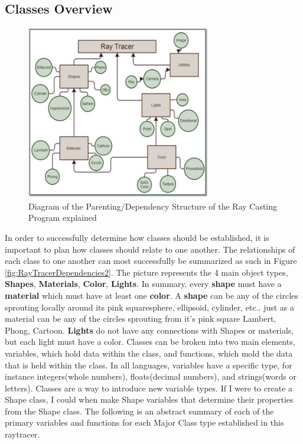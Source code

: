 \subsection{Classes Overview}
\begin{figure}[ht]
\centering
\includegraphics[height=3.0in]{figures/rayTracerStructure.jpg}
\caption{Diagram of the Parenting/Dependency Structure of the Ray Casting Program explained}
\label{fig:RayTracerDependencies}
\end{figure}
In order to successfully determine how classes should be established, it is important to plan how classes should relate to one another.  The relationships of each class to one another can most successfully be summarized as such in Figure \ref{fig:RayTracerDependencies2}.  The picture represents the 4 main object types, \textbf{Shapes}, \textbf{Materials}, \textbf{Color}, \textbf{Lights}. In summary, every \textbf{shape} must have a \textbf{material} which must have at least one \textbf{color}. A \textbf{shape} can be any of the circles sprouting locally around its pink square{sphere, ellipsoid, cylinder, etc..} just as a material can be any of the circles sprouting from it's pink square {Lambert, Phong, Cartoon}.  \textbf{Lights} do not have any connections with Shapes or materials, but each light must have a color.  Classes can be broken into two main elements, variables, which hold data within the class, and functions, which mold the data that is held within the class.  In all languages, variables have a specific type, for instance integers(whole numbers), floats(decimal numbers), and strings(words or letters).  Classes are a way to introduce new variable types.  If I were to create a Shape class, I could when make Shape variables that determine their properties from the Shape class.  The following is an abstract summary of each of the primary variables and functions for each Major Class type established in this raytracer.
